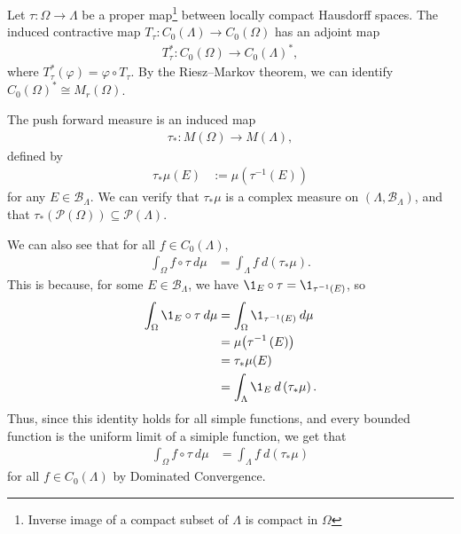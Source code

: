 \documentclass[10pt]{mypackage}
\begin{document}
\begin{example}
  Let $\tau: \Omega \rightarrow \Lambda$ be a proper map\footnote{Inverse image of a compact subset of $\Lambda$ is compact in $\Omega$} between locally compact Hausdorff spaces. The induced contractive map $T_{\tau}: C_0\left(\Lambda\right)\rightarrow C_0\left(\Omega\right)$ has an adjoint map
  \begin{align*}
    T_{\tau}^{\ast}: C_0\left(\Omega\right)\rightarrow C_0\left(\Lambda\right)^{\ast},
  \end{align*}
  where $T_{\tau}^{\ast}\left(\varphi\right) = \varphi\circ T_{\tau}$. By the Riesz--Markov theorem, we can identify $C_0\left(\Omega\right)^{\ast}\cong M_{r}\left(\Omega\right)$.\newline

  The push forward measure is an induced map
  \begin{align*}
    \tau_{\ast}: M(\Omega) \rightarrow M(\Lambda),
  \end{align*}
  defined by
  \begin{align*}
    \tau_{\ast}\mu\!\left(E\right) &:= \mu\!\left(\tau^{-1}\left(E\right)\right)
  \end{align*}
  for any $E\in \mathcal{B}_{\Lambda}$. We can verify that $\tau_{\ast}\mu$ is a complex measure on $\left(\Lambda,\mathcal{B}_{\Lambda}\right)$, and that $\tau_{\ast}\left(\mathcal{P}\left(\Omega\right)\right)\subseteq \mathcal{P}\left(\Lambda\right)$.\newline

  We can also see that for all $f\in C_0\left(\Lambda\right)$,
  \begin{align*}
    \int_{\Omega}f\circ \tau\:d\mu &= \int_{\Lambda}f\:d\left(\tau_{\ast}\mu\right).
  \end{align*}
  This is because, for some $E\in \mathcal{B}_{\Lambda}$, we have $\1_{E}\circ \tau = \1_{\tau^{-1}\left(E\right)}$, so
  \begin{align*}
    \int_{\Omega}\1_{E}\circ \tau\:d\mu &= \int_{\Omega}\1_{\tau^{-1}\left(E\right)}\:d\mu\\
                                        &= \mu\!\left(\tau^{-1}\left(E\right)\right)\\
                                        &= \tau_{\ast}\mu\!\left(E\right)\\
                                        &= \int_{\Lambda}\1_{E}\:d\left(\tau_{\ast}\mu\right).
  \end{align*}
  Thus, since this identity holds for all simple functions, and every bounded function is the uniform limit of a simiple function, we get that
  \begin{align*}
    \int_{\Omega}f\circ \tau\:d\mu &= \int_{\Lambda}f\:d\left(\tau_{\ast}\mu\right)
  \end{align*}
  for all $f\in C_0\left(\Lambda\right)$ by Dominated Convergence.\newline


\end{example}
\end{document}
